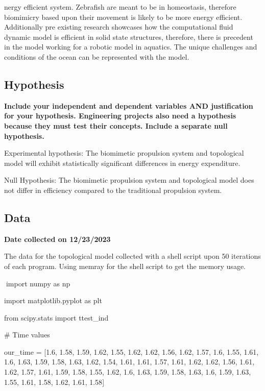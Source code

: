 nergy efficient
system. Zebrafish are meant to be in homeostasis, therefore biomimicry
based upon their movement is likely to be more energy efficient.
Additionally pre existing research showcases how the computational fluid
dynamic model is efficient in solid state structures, therefore, there
is precedent in the model working for a robotic model in aquatics. The
unique challenges and conditions of the ocean can be represented with
the model.

\subsection{Hypothesis}\label{hypothesis}

\textbf{Include your independent and dependent variables AND
justification for your hypothesis. Engineering projects also need a
hypothesis because they must test their concepts. Include a separate
null hypothesis.}

Experimental hypothesis: The biomimetic propulsion system and
topological model will exhibit statistically significant differences in
energy expenditure.

Null Hypothesis: The biomimetic propulsion system and topological model
does not differ in efficiency compared to the traditional propulsion
system.

\subsection{\texorpdfstring{\hfill\break
}{ }}\label{section-13}

\subsection{Data}\label{data}

\textbf{Date collected on 12/23/2023}

The data for the topological model collected with a shell script upon 50
iterations of each program. Using memray for the shell script to get the
memory usage.

import numpy as np

import matplotlib.pyplot as plt

from scipy.stats import ttest\_ind

\# Time values

our\_time = {[}1.6, 1.58, 1.59, 1.62, 1.55, 1.62, 1.62, 1.56, 1.62,
1.57, 1.6, 1.55, 1.61, 1.6, 1.63, 1.59, 1.58, 1.63, 1.62, 1.54, 1.61,
1.61, 1.57, 1.61, 1.62, 1.62, 1.56, 1.61, 1.62, 1.57, 1.61, 1.59, 1.58,
1.55, 1.62, 1.6, 1.63, 1.59, 1.58, 1.63, 1.6, 1.59, 1.63, 1.55, 1.61,
1.58, 1.62, 1.61, 1.58{]}

